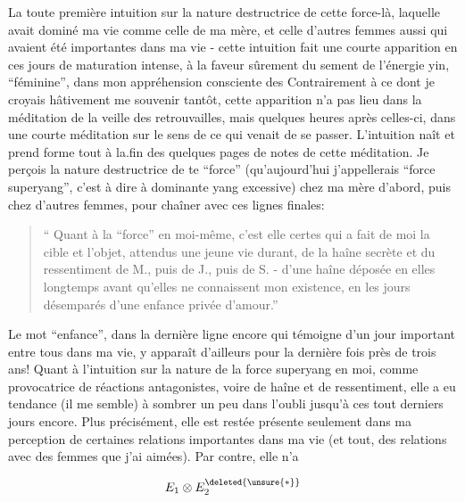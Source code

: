 La toute première intuition sur la nature destructrice de cette force-là, laquelle avait dominé ma vie comme celle de ma mère, et celle d'autres femmes aussi qui avaient été importantes dans ma vie - cette intuition fait une courte apparition en ces jours de maturation intense, à la faveur sûrement du \newline sement de l'énergie yin, ``féminine'', dans mon appréhension consciente des  Contrairement à ce dont je croyais hâtivement me souvenir tantôt, cette apparition n'a pas lieu dans la méditation de la veille des retrouvailles, mais quelques heures après celles-ci, dans une courte méditation sur le sens de ce qui venait de se passer. L'intuition naît et prend forme tout à la.fin des quelques pages de notes de cette méditation. Je perçois la nature destructrice de \newline te ``force'' (qu'aujourd'hui j'appellerais ``force superyang'', c'est à dire à dominante yang excessive) chez ma mère d'abord, puis chez d'autres femmes, pour chaîner avec ces lignes finales:

\begin{quote}
`` Quant à la ``force'' en moi-même, c'est elle certes qui a fait de moi la cible et l'objet, attendus une jeune vie durant, de la haîne secrète et du ressentiment de M., puis de J., puis de S. - d'une haîne déposée en elles longtemps avant qu'elles ne connaissent mon existence, en les jours désemparés d'une enfance privée d'amour.''
\end{quote}

Le mot ``enfance'', dans la dernière ligne encore qui témoigne d'un jour important entre tous dans ma vie, y apparaît d'ailleurs pour la dernière fois  près de trois ans! Quant à l'intuition sur la nature de la force superyang en moi, comme provocatrice de réactions antagonistes, voire de haîne et de ressentiment, elle a eu tendance (il me semble) à sombrer un peu dans l'oubli jusqu'à ces tout derniers jours encore. Plus précisément, elle est restée présente seulement dans ma perception de certaines relations importantes dans ma vie (et \newline tout, des relations avec des femmes que j'ai aimées). Par contre, elle n'a 


\[
 E_1\otimes E_2^{\deleted{\unsure{*}}}
\]

